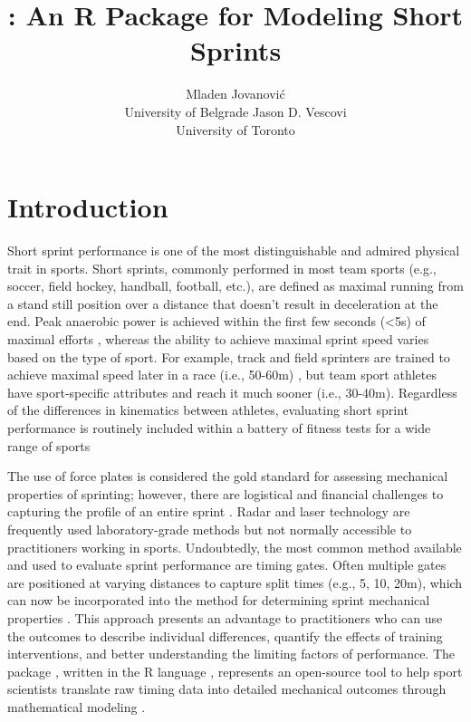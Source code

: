 \documentclass[
]{jss}
\author{
Mladen Jovanović\\University of Belgrade \And Jason D. Vescovi\\University of Toronto
}
\title{\pkg{shorts}: An R Package for Modeling Short Sprints}
\begin{document}
\hypertarget{introduction}{%
\section{Introduction}\label{introduction}}

Short sprint performance is one of the most distinguishable and admired physical trait in sports. Short sprints, commonly performed in most team sports (e.g., soccer, field hockey, handball, football, etc.), are defined as maximal running from a stand still position over a distance that doesn't result in deceleration at the end. Peak anaerobic power is achieved within the first few seconds (\textless5s) of maximal efforts \citep{mangineSpeedForcePower2014}, whereas the ability to achieve maximal sprint speed varies based on the type of sport. For example, track and field sprinters are trained to achieve maximal speed later in a race (i.e., 50-60m) \citep{ward-smithEnergyConversionStrategies2001}, but team sport athletes have sport-specific attributes and reach it much sooner (i.e., 30-40m)\citep{brownAssessmentLinearSprinting2004}. Regardless of the differences in kinematics between athletes, evaluating short sprint performance is routinely included within a battery of fitness tests for a wide range of sports

The use of force plates is considered the gold standard for assessing mechanical properties of sprinting; however, there are logistical and financial challenges to capturing the profile of an entire sprint \citep{morinSimpleMethodComputing2019, samozinoSimpleMethodMeasuring2016}. Radar and laser technology are frequently used laboratory-grade methods \citep{buchheitMechanicalDeterminantsAcceleration2014, edwardsSprintAccelerationCharacteristics2020, jimenez-reyesRelationshipVerticalHorizontal2018, marcote-pequenoAssociationForceVelocity2019} but not normally accessible to practitioners working in sports. Undoubtedly, the most common method available and used to evaluate sprint performance are timing gates. Often multiple gates are positioned at varying distances to capture split times (e.g., 5, 10, 20m), which can now be incorporated into the method for determining sprint mechanical properties \citep{morinSimpleMethodComputing2019, samozinoSimpleMethodMeasuring2016}. This approach presents an advantage to practitioners who can use the outcomes to describe individual differences, quantify the effects of training interventions, and better understanding the limiting factors of performance. The  package \citep{R-shorts}, written in the R language \citep{R-base}, represents an open-source tool to help sport scientists translate raw timing data into detailed mechanical outcomes through mathematical modeling \citep{morinSimpleMethodComputing2019, samozinoSimpleMethodMeasuring2016}.
\end{document}
